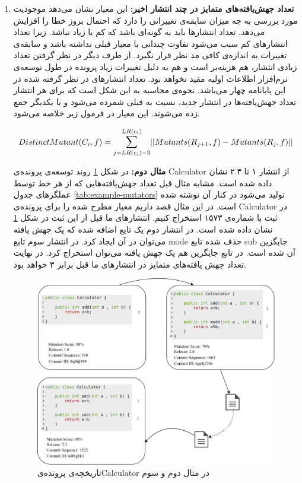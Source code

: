 \begin{enumerate}
\item 
\textbf{
		تعداد جهش‌یافته‌های متمایز در چند انتشار اخیر:} این معیار نشان می‌دهد موجودیت مورد بررسی به چه میزان سابقه‌ی تغییراتی را دارد که احتمال بروز خطا را افزایش می‌دهد. تعداد انتشارها باید به گونه‌ای باشد که کم یا زیاد نباشد. زیرا تعداد انتشارهای کم سبب می‌شود تفاوت چندانی با معیار قبلی نداشته باشد و سابقه‌ی تغییرات به اندازه‌ی کافی مد نظر قرار نگیرد. از طرف دیگر در نظر گرفتن تعداد زیادی انتشار، هم هزینه‌بر است و هم به دلیل تغییرات زیاد  پرونده در طول توسعه‌ی نرم‌افزار اطلاعات اولیه مفید نخواهد بود.  تعداد انتشارهای  در نظر گرفته شده در این پایانامه چهار می‌باشد. نحوه‌ی محاسبه به این شکل است که برای هر انتشار تعداد جهش‌یافته‌ها در انتشار جدید، نسبت به قبلی  شمرده می‌شود و با یکدیگر جمع زده  می‌شوند. این معیار در فرمول زیر خلاصه می‌شود. 
	

\begin{latin}
\[ 	
DistinctMutant(C_i,f) = \mathlarger{\sum}\limits_{j=LR(c_i)-3}^{LR(c_i)} 
|| Mutants(R_{j+1},f) - Mutants(R_j,f)|| 
\]
\end{latin}

	
\textbf{مثال دوم:}
در شکل \ref{fig:example2} روند توسعه‌ی پرونده‌ی  Calculator از انتشار ۱ تا ۲.۳ نشان داده شده است. مشابه مثال قبل تعداد جهش‌یافته‌هایی که از هر خط توسط عملگرهای جدول \ref{tab:example-mutators}  تولید می‌شود در کنار آن نوشته شده است. در این مثال قصد داریم معیار مطرح شده را برای پرونده‌ی Calculator‌ در ثبت با شماره‌ی ۱۵۷۳ استخراج کنیم. انتشارهای‌ ما قبل از این ثبت در شکل  \ref{fig:example2} نشان داده شده است. در انتشار دوم یک تابع اضافه شده که یک جهش یافته می‌توان در آن ایجاد کرد. در انتشار سوم تابع mode حذف شده  تابع sub جایگزین آن شده است. در تابع جایگزین هم یک جهش یافته می‌توان استخراج کرد. در نهایت تعداد جهش یافته‌های متمایز در انتشارهای ما قبل برابر ۳ خواهد بود. 


\begin{figure}[H]
	\centering
	\includegraphics[width=1\textwidth]{img/method/example2.png}
	\caption{ تاریخچه‌ی پرونده‌یCalculator در مثال دوم و سوم}
	\label{fig:example2}
\end{figure}


\end{enumerate}
